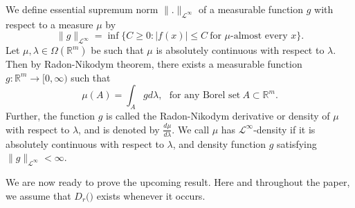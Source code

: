 \documentclass{amsproc}
\theoremstyle{definition}
\newtheorem{definition}[theorem]{Definition}
\theoremstyle{remark}
\numberwithin{equation}{section}
\begin{document}
We define essential supremum norm $\|.\|_{\mathcal{L}^{\infty}}$ of a measurable function $g$ with respect to a measure $\mu$ by 
\[
 \|g\|_{\mathcal{L}^{\infty}}= \inf \{C\ge 0 : |f(x)| \le C ~\text{for $\mu$-almost every $x$} \}.
\]
Let $\mu ,\lambda \in \Omega( \mathbb{R}^m)$ be such that $\mu$ is absolutely continuous with respect to $\lambda.$ Then by Radon-Nikodym theorem, there exists a measurable function $g: \mathbb{R}^m \to [0, \infty) $ such that $$ \mu(A)= \int_A g d\lambda,~~~\text{for any Borel set}~A \subset \mathbb{R}^m.$$
Further, the function $g$ is called the Radon-Nikodym derivative or density of $\mu$ with respect to $\lambda$, and is denoted by $\frac{ d\mu}{ d\lambda}.$
We call $\mu$ has $\mathcal{L}^{\infty}$-density if it is absolutely continuous with respect to $\lambda$, and density function $g$ satisfying
 $\|g\|_{\mathcal{L}^{\infty}} < \infty.$  
\par
We are now ready to prove the upcoming result. Here and throughout the paper, we assume that $D_r(\mathfrak)$ exists whenever it occurs.
\end{document}
